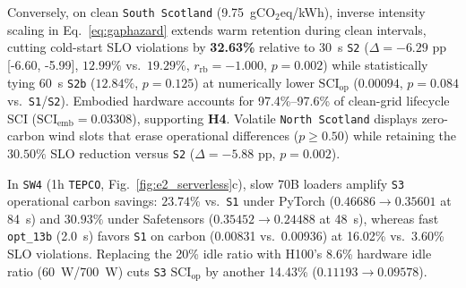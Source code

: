 Conversely, on clean \texttt{South Scotland} (9.75~gCO$_2$eq/kWh), inverse intensity scaling in Eq.~\eqref{eq:gaphazard} extends warm retention during clean intervals, cutting cold-start SLO violations by \textbf{32.63\%} relative to 30~s \texttt{S2} ($\Delta = -6.29\text{ pp}$ [-6.60, -5.99], $12.99\%$ vs.\ $19.29\%$, $r_{\text{rb}}=-1.000$, $p=0.002$) while statistically tying 60~s \texttt{S2b} ($12.84\%$, $p=0.125$) at numerically lower $\text{SCI}_{\text{op}}$ ($0.00094$, $p=0.084$ vs.\ \texttt{S1}/\texttt{S2}). Embodied hardware accounts for 97.4\%--97.6\% of clean-grid lifecycle SCI ($\text{SCI}_{\text{emb}}=0.03308$), supporting \textbf{H4}. Volatile \texttt{North Scotland} displays zero-carbon wind slots that erase operational differences ($p \ge 0.50$) while retaining the $30.50\%$ SLO reduction versus \texttt{S2} ($\Delta=-5.88\text{ pp}$, $p=0.002$).

In \texttt{SW4} (1h \texttt{TEPCO}, Fig.~\ref{fig:e2_serverless}c), slow 70B loaders amplify \texttt{S3} operational carbon savings: $23.74\%$ vs.\ \texttt{S1} under PyTorch ($0.46686 \rightarrow 0.35601$ at 84~s) and $30.93\%$ under Safetensors ($0.35452 \rightarrow 0.24488$ at 48~s), whereas fast \texttt{opt\_13b} (2.0~s) favors \texttt{S1} on carbon (0.00831 vs.\ 0.00936) at 16.02\% vs.\ 3.60\% SLO violations. Replacing the 20\% idle ratio with H100's 8.6\% hardware idle ratio (60~W/700~W) cuts \texttt{S3} $\text{SCI}_{\text{op}}$ by another 14.43\% ($0.11193 \rightarrow 0.09578$).

